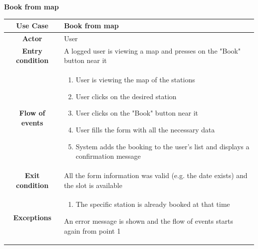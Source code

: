 \documentclass[table, 12pt]{article} %
\begin{document}
\begin{itemize}
             \begin{table}[H]
                \item[] \textbf{Book from map}
                \item[]
                \centering
                \begin{tabular}{|c |m{}|}
                    \hline
                    \textbf{Use Case} & Book from map\\ \hline
                    \textbf{Actor} & User\\ \hline
                    \textbf{Entry condition} & A logged user is viewing a map and presses on the "Book" button near it \\  \hline
                    \textbf{Flow of events} & \begin{enumerate}
                                                \item User is viewing the map of the stations
                                                \item User clicks on the desired station
                                                \item User clicks on the "Book" button near it
                                                \item User fills the form with all the necessary data
                                                \item System adds the booking to the user's list and displays a confirmation message
                                            \end{enumerate}\\ \hline
                    \textbf{Exit condition} &  All the form information was valid (e.g. the date exists) and the slot is available\\ \hline
                    \textbf{Exceptions} &  \begin{enumerate}
                        \item The specific station is already booked at that time
                    \end{enumerate}
                    An error message is shown and the flow of events starts again from point 1\\ \hline
                \end{tabular}
            \end{table}


\end{itemize}
\end{document}
